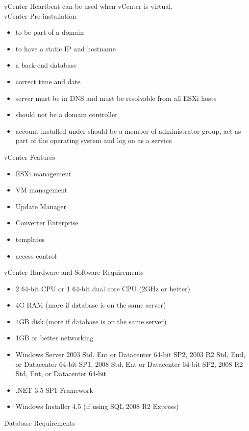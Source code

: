 vCenter Heartbeat can be used when vCenter is virtual.\\

vCenter Pre-installation

\begin{itemize}
\item to be part of a domain
\item to have a static IP and hostname
\item a back-end database
\item correct time and date
\item server must be in DNS and must be resolvable from all ESXi hosts
\item should not be a domain controller
\item account installed under should be a member of administrator group, act as
part of the operating system and log on as a service
\end{itemize}

vCenter Features

\begin{itemize}
\item ESXi management
\item VM management
\item Update Manager
\item Converter Enterprise
\item templates
\item access control
\end{itemize}

vCenter Hardware and Software Requirements

\begin{itemize}
\item 2 64-bit CPU or 1 64-bit dual core CPU (2GHz or better)
\item 4G RAM (more if database is on the same server)
\item 4GB disk (more if database is on the same server)
\item 1GB or better networking
\item Windows Server 2003 Std, Ent or Datacenter 64-bit SP2, 2003 R2 Std, End, or Datacenter
64-bit SP1, 2008 Std, Ent or Datacenter 64-bit SP2, 2008 R2 Std, Ent, or Datacenter 64-bit
\item .NET 3.5 SP1 Framework
\item Windows Installer 4.5 (if using SQL 2008 R2 Express)
\end{itemize}

Database Requirements

